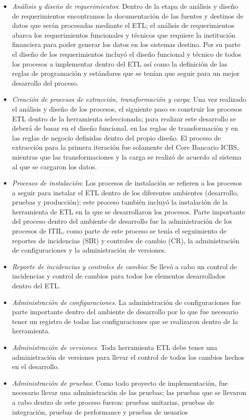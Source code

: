 \documentclass[a4paper,openright,12pt]{book}
\begin{document}
\begin{itemize}
\item \textit{An\'alisis y dise\~no de requerimientos}: Dentro de la etapa de an\'alisis y dise\~no de requerimientos encontramos la documentaci\'on de las fuentes y destinos de datos que ser\'an procesadas mediante el ETL; el an\'alisis de requerimientos abarca los requerimientos funcionales y t\'ecnicos que requiere la instituci\'on financiera para poder generar los datos en los sistemas destino. 
Por su parte el dise\~no de los requerimientos incluy\'o el dise\~no funcional y t\'ecnico de todos los procesos a implementar dentro del ETL as\'i como la definici\'on de las reglas de programaci\'on y est\'andares que se ten\'ian que seguir para un mejor desarrollo del proceso.
\item \textit{Creaci\'on de procesos de extracci\'on, transformaci\'on y carga}: Una vez realizado el an\'alisis y dise\~no de los procesos, el siguiente paso es construir los procesos ETL dentro de la herramienta seleccionada; para realizar este desarrollo se deber\'a de basar en el dise\~no funcional, en las reglas de transformaci\'on y en las reglas de negocio definidas dentro del propio dise\~no. El proceso de extracci\'on para la primera iteraci\'on fue solamente del Core Bancario ICBS, mientras que las transformaciones y la carga se realiz\'o de acuerdo al sistema al que se cargaron los datos.
\item \textit{Procesos de instalaci\'on}: Los procesos de instalaci\'on se refieren a los procesos a seguir para instalar el ETL dentro de los diferentes ambientes (desarrollo, pruebas y producci\'on); este proceso también incluy\'o la instalaci\'on de la herramienta de ETL en la que se desarrollaron los procesos.
Parte importante del proceso dentro del ambiente de desarrollo fue la administraci\'on de los procesos de ITIL, como parte de este proceso se ten\'ia el seguimiento de reportes de incidencias (SIR) y controles de cambio (CR), la administraci\'on de configuraciones y la administraci\'on de versiones.
\item \textit{Reporte de incidencias y controles de cambio}: Se llev\'o a cabo un control de incidencias y control de cambios para todos los elementos desarrollados dentro del ETL.

\item \textit{Administraci\'on de configuraciones}. La administraci\'on de configuraciones fue parte importante dentro del ambiente de desarrollo por lo que fue necesario tener un registro de todas las configuraciones que se realizaron dentro de la herramienta.

\item \textit{Administraci\'on de versiones}. Toda herramienta ETL debe tener una administraci\'on de versiones para llevar el control de todos los cambios hechos en el desarrollo.

\item \textit{Administraci\'on de pruebas}: Como todo proyecto de implementaci\'on, fue necesario llevar una administraci\'on de las pruebas; las pruebas que se llevaron a cabo dentro de este proceso fueron: pruebas unitarias, pruebas de integraci\'on, pruebas de performance y pruebas de usuarios
\end{itemize}
\end{document}

